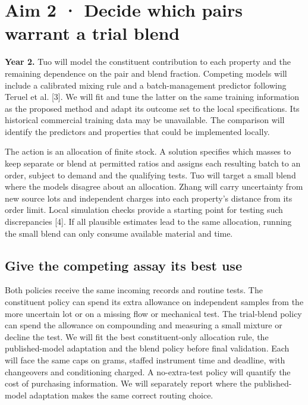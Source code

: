 \documentclass[11pt,letterpaper]{article}
\begin{document}
\newpage

\section*{Aim 2 · Decide which pairs warrant a trial blend}

\textbf{Year 2.} Tuo will model the constituent contribution to each property and the remaining dependence on the pair and blend fraction. Competing models will include a calibrated mixing rule and a batch-management predictor following Teruel et al. [3]. We will fit and tune the latter on the same training information as the proposed method and adapt its outcome set to the local specifications. Its historical commercial training data may be unavailable. The comparison will identify the predictors and properties that could be implemented locally.

The action is an allocation of finite stock. A solution specifies which masses to keep separate or blend at permitted ratios and assigns each resulting batch to an order, subject to demand and the qualifying tests. Tuo will target a small blend where the models disagree about an allocation. Zhang will carry uncertainty from new source lots and independent charges into each property's distance from its order limit. Local simulation checks provide a starting point for testing such discrepancies [4]. If all plausible estimates lead to the same allocation, running the small blend can only consume available material and time.

\subsection*{Give the competing assay its best use}

Both policies receive the same incoming records and routine tests. The constituent policy can spend its extra allowance on independent samples from the more uncertain lot or on a missing flow or mechanical test. The trial-blend policy can spend the allowance on compounding and measuring a small mixture or decline the test. We will fit the best constituent-only allocation rule, the published-model adaptation and the blend policy before final validation. Each will face the same caps on grams, staffed instrument time and deadline, with changeovers and conditioning charged. A no-extra-test policy will quantify the cost of purchasing information. We will separately report where the published-model adaptation makes the same correct routing choice.
\end{document}
